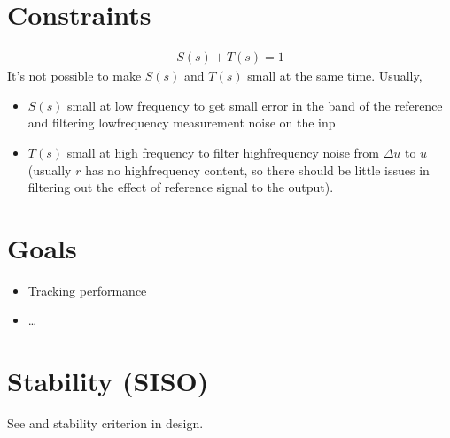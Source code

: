 \documentclass[letterpaper,10pt,english]{jupyterBook}
\begin{document}
\section{Constraints}
\label{\detokenize{ch/control/closed-loop-requirements-performance:constraints}}\begin{equation*}
\begin{split}S(s) + T(s) = 1\end{split}
\end{equation*}
\sphinxAtStartPar
It’s not possible to make \(S(s)\) and \(T(s)\) small at the same time. Usually,
\begin{itemize}
\item {} 
\sphinxAtStartPar
\(S(s)\) small at low frequency to get small error in the band of the reference and filtering low\sphinxhyphen{}frequency measurement noise on the inp

\item {} 
\sphinxAtStartPar
\(T(s)\) small at high frequency to filter high\sphinxhyphen{}frequency noise from \(\Delta u\) to \(u\) (usually \(r\) has no high\sphinxhyphen{}frequency content, so there should be little issues in filtering out the effect of reference signal to the output).

\end{itemize}


\section{Goals}
\label{\detokenize{ch/control/closed-loop-requirements-performance:goals}}\begin{itemize}
\item {} 
\sphinxAtStartPar
Tracking performance

\item {} 
\sphinxAtStartPar
…

\end{itemize}

\sphinxstepscope


\section{Stability (SISO)}
\label{\detokenize{ch/control/closed-loop-requirements-performance-siso-stability:stability-siso}}\label{\detokenize{ch/control/closed-loop-requirements-performance-siso-stability:control-closed-loop-requirements-performance-siso-stability}}\label{\detokenize{ch/control/closed-loop-requirements-performance-siso-stability::doc}}
\sphinxAtStartPar
See {\hyperref[\detokenize{ch/control/frequency-domain:control-frequency-siso-nyquist}]{}} and {\hyperref[\detokenize{ch/control/frequency-domain:control-siso-bode}]{}} stability criterion in {\hyperref[\detokenize{ch/control/frequency-domain:control-frequency}]{}} design.
\end{document}
